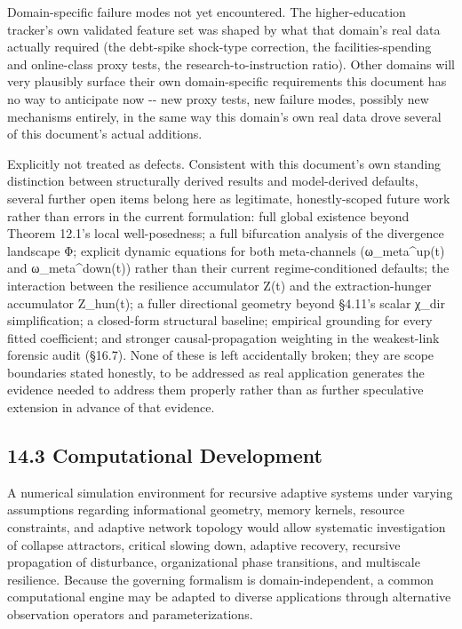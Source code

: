 \documentclass[
]{article}
\begin{document}
Domain-specific failure modes not yet encountered. The higher-education
tracker's own validated feature set was shaped by what that domain's
real data actually required (the debt-spike shock-type correction, the
facilities-spending and online-class proxy tests, the
research-to-instruction ratio). Other domains will very plausibly
surface their own domain-specific requirements this document has no way
to anticipate now -\/- new proxy tests, new failure modes, possibly new
mechanisms entirely, in the same way this domain's own real data drove
several of this document's actual additions.

Explicitly not treated as defects. Consistent with this document's own
standing distinction between structurally derived results and
model-derived defaults, several further open items belong here as
legitimate, honestly-scoped future work rather than errors in the
current formulation: full global existence beyond Theorem 12.1's local
well-posedness; a full bifurcation analysis of the divergence landscape
Φ; explicit dynamic equations for both meta-channels (ω\_meta\^{}up(t)
and ω\_meta\^{}down(t)) rather than their current regime-conditioned
defaults; the interaction between the resilience accumulator Z(t) and
the extraction-hunger accumulator Z\_hun(t); a fuller directional
geometry beyond §4.11's scalar χ\_dir simplification; a closed-form
structural baseline; empirical grounding for every fitted coefficient;
and stronger causal-propagation weighting in the weakest-link forensic
audit (§16.7). None of these is left accidentally broken; they are scope
boundaries stated honestly, to be addressed as real application
generates the evidence needed to address them properly rather than as
further speculative extension in advance of that evidence.

\hypertarget{computational-development}{%
\subsection{14.3 Computational
Development}\label{computational-development}}

A numerical simulation environment for recursive adaptive systems under
varying assumptions regarding informational geometry, memory kernels,
resource constraints, and adaptive network topology would allow
systematic investigation of collapse attractors, critical slowing down,
adaptive recovery, recursive propagation of disturbance, organizational
phase transitions, and multiscale resilience. Because the governing
formalism is domain-independent, a common computational engine may be
adapted to diverse applications through alternative observation
operators and parameterizations.
\end{document}
